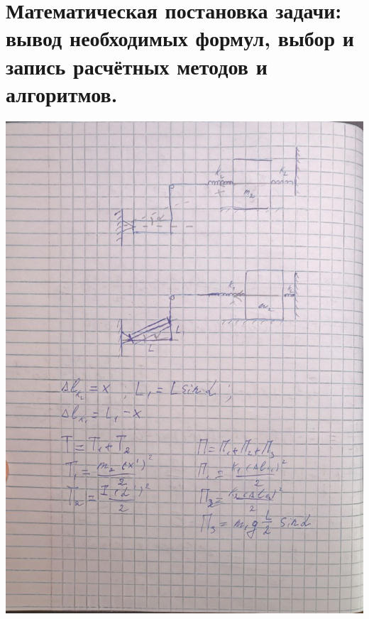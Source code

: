 \documentclass[a4paper,14pt]{extarticle}
\begin{document}
\section{Математическая постановка задачи: вывод необходимых формул, выбор и запись расчётных методов и алгоритмов.}
\begin{center}
    \includegraphics[width=200mm]{mod1}

\end{center}
\end{document}
